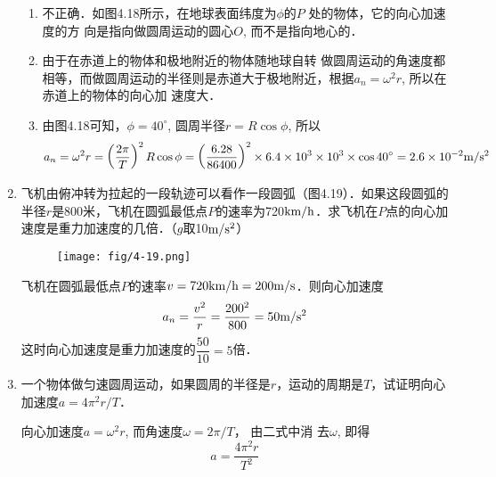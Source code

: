 \begin{enumerate}
\begin{solution}
\begin{enumerate}
    \item 不正确．如图4.18所示，在地球表面纬度为$\phi$的$P$
    处的物体，它的向心加速度的方
    向是指向做圆周运动的圆心$O$,
    而不是指向地心的．
    \item 由于在赤道上的物体和极地附近的物体随地球自转
    做圆周运动的角速度都相等，而做圆周运动的半径则是赤道大于极地附近，根据$a_n=\omega^2 r$, 所以在赤道上的物体的向心加
    速度大．
    \item 由图4.18可知，$\phi=40^{\circ}$, 圆周半径$r=R\cos\phi$, 所以
\[a_n=\omega^2r=\left(\frac{2\pi}{T}\right)^2R\cos\phi=\left(\frac{6.28}{86400}\right)^2\times6.4\times10^3\times10^3\times
    \cos40^{\circ}=2.6\times10^{-2}\text{m}/\text{s}^2\]
\end{enumerate}
\end{solution}
\item	 飞机由俯冲转为拉起的一段轨迹可以看作一段圆弧（图4.19）．如果这段圆弧的半径$r$是800米，飞机在圆弧最低点$P$的速率为720$\text{km}/\text{h}$．求飞机在$P$点的向心加速度是重力加速度的几倍．（$g$取10$\text{m}/\text{s}^2$）
\begin{figure}[htp]
\centering
\texttt{[image: fig/4-19.png]}
\caption{}
\end{figure}


\begin{solution}
    飞机在圆弧最低点$P$的速率$v=720\text{km}/\text{h}=200\text{m}/\text{s}$．则向心加速度
   \[a_n=\frac{v^2}{r}=\frac{200^2}{800}=50\text{m}/\text{s}^2\]
   这时向心加速度是重力加速度的$\dfrac{50}{10}=5$倍．
\end{solution}
	\item 一个物体做匀速圆周运动，如果圆周的半径是$r$，运动的周期是$T$，试证明向心加速度$a=4\pi^2r/T$．

    \begin{solution}
        向心加速度$a=\omega^2 r$, 而角速度$\omega=2\pi/T$，
        由二式中消
        去$\omega$, 即得
        \[a=\frac{4\pi^2r}{T^2}\]
    \end{solution}
\end{enumerate}



